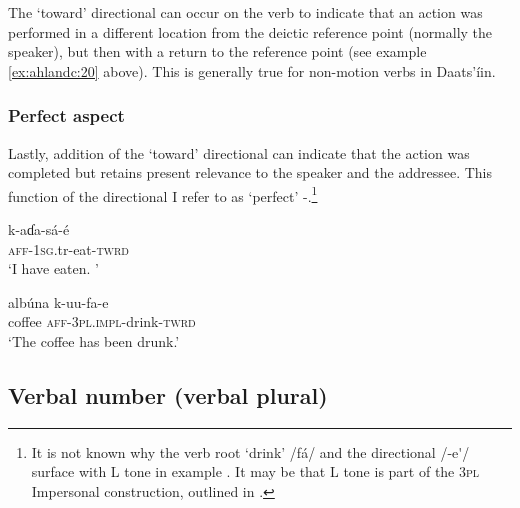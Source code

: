 \documentclass[output=paper]{langsci/langscibook}
\begin{document}
The ‘toward’ directional can occur on the verb to indicate that an action was performed in a different location from the deictic reference point (normally the speaker), but then with a return to the reference point (see example \ref{ex:ahlandc:20} above). This is generally true for non-motion verbs in Daats’íin.

\subsubsection{Perfect aspect}\label{sec:ahlandc:4.6.3}

Lastly, addition of the ‘toward’ directional can indicate that the action was completed but retains present relevance to the speaker and the addressee. This function of the directional I refer to as ‘perfect’ -.\footnote{It is not known why the verb root ‘drink’ /fá/ and the directional /-e\'{ }/ surface with L tone in example .  It may be that L tone is part of the 3\textsc{pl} Impersonal construction, outlined in .}

\ea\label{ex:ahlandc:34}
\gll
k-aɗa-sá-é  \\
\textsc{aff-1sg}.tr{}-eat-\textsc{twrd} \\
\glt
‘I have eaten. ’
\z

\ea\label{ex:ahlandc:35}
\gll
alb\'{u}na k-uu-fa-e \\
coffee \textsc{aff-3pl.impl}{}-drink-\textsc{twrd} \\
\glt
‘The coffee has been drunk.’
\z


\subsection{Verbal number (verbal plural)}\label{sec:ahlandc:4.7}
\end{document}
